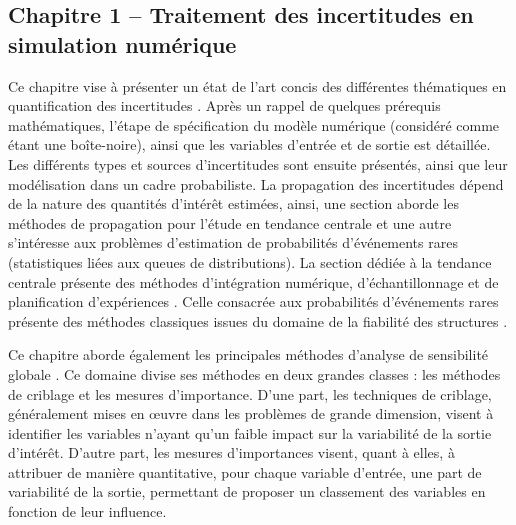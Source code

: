 \subsection*{Chapitre 1 -- Traitement des incertitudes en simulation num\'{e}rique}
Ce chapitre vise à pr\'{e}senter un \'{e}tat de l'art concis des diff\'{e}rentes th\'{e}matiques en quantification des incertitudes \citep{sullivan_2015}. 
Après un rappel de quelques pr\'{e}requis math\'{e}matiques, l'\'{e}tape de sp\'{e}cification du modèle num\'{e}rique (consid\'{e}r\'{e} comme \'{e}tant une boîte-noire), ainsi que les variables d'entr\'{e}e et de sortie est d\'{e}taill\'{e}e. 
Les diff\'{e}rents types et sources d'incertitudes sont ensuite pr\'{e}sent\'{e}s, ainsi que leur mod\'{e}lisation dans un cadre probabiliste. 
La propagation des incertitudes d\'{e}pend de la nature des quantit\'{e}s d'int\'{e}rêt estim\'{e}es, ainsi, une section aborde les m\'{e}thodes de propagation pour l'\'{e}tude en tendance centrale et une autre s'int\'{e}resse aux problèmes d'estimation de probabilit\'{e}s d'\'{e}v\'{e}nements rares (statistiques li\'{e}es aux queues de distributions). 
La section d\'{e}di\'{e}e à la tendance centrale pr\'{e}sente des m\'{e}thodes d'int\'{e}gration num\'{e}rique, d'\'{e}chantillonnage et de planification d'exp\'{e}riences \citep{fang_liu_2018}. 
Celle consacr\'{e}e aux probabilit\'{e}s d'\'{e}v\'{e}nements rares pr\'{e}sente des m\'{e}thodes classiques issues du domaine de la fiabilit\'{e} des structures \citep{lemaire_2009,MorioBalesdent2015}.

Ce chapitre aborde \'{e}galement les principales m\'{e}thodes d'analyse de sensibilit\'{e} globale \citep{daveiga_iooss_2021}. 
Ce domaine divise ses m\'{e}thodes en deux grandes classes : les m\'{e}thodes de criblage et les mesures d'importance. 
D'une part, les techniques de criblage, g\'{e}n\'{e}ralement mises en \oe{}uvre dans les problèmes de grande dimension, visent à identifier les variables n'ayant qu'un faible impact sur la variabilit\'{e} de la sortie d'int\'{e}rêt. 
D'autre part, les mesures d'importances visent, quant à elles, à attribuer de manière quantitative, pour chaque variable d'entr\'{e}e, une part de variabilit\'{e} de la sortie, permettant de proposer un classement des variables en fonction de leur influence.

